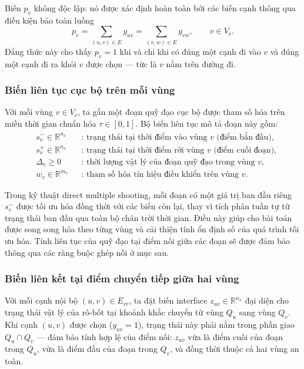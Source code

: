 Biến $p_v$ không độc lập: nó được xác định hoàn toàn bởi các biến cạnh thông qua điều kiện bảo toàn luồng
\[
p_v
=\sum_{(u,v)\in E} y_{uv}
=\sum_{(v,w)\in E} y_{vw},
\qquad v\in V_r.
\]
Đẳng thức này cho thấy $p_v=1$ khi và chỉ khi có đúng một cạnh đi vào $v$ và đúng một cạnh đi ra khỏi $v$ được chọn — tức là $v$ nằm trên đường đi.

\subsubsection{Biến liên tục cục bộ trên mỗi vùng}

Với mỗi vùng $v\in V_r$, ta gắn một đoạn quỹ đạo cục bộ được tham số hóa trên miền thời gian chuẩn hóa $\tau\in[0,1]$. Bộ biến liên tục mô tả đoạn này gồm:
\begin{align}
& s_v^- \in \mathbb R^{n_x} && \text{: trạng thái tại thời điểm vào vùng } v \text{ (điểm bắn đầu),} \nonumber\\
& s_v^+ \in \mathbb R^{n_x} && \text{: trạng thái tại thời điểm rời vùng } v \text{ (điểm cuối đoạn),} \nonumber\\
& \Delta_v \ge 0 && \text{: thời lượng vật lý của đoạn quỹ đạo trong vùng } v, \nonumber\\
& w_v \in \mathbb R^{m_v} && \text{: tham số hóa tín hiệu điều khiển trên vùng } v. \nonumber
\end{align}

Trong kỹ thuật direct multiple shooting, mỗi đoạn có một giá trị ban đầu riêng $s_v^-$ được tối ưu hóa đồng thời với các biến còn lại, thay vì tích phân tuần tự từ trạng thái ban đầu qua toàn bộ chân trời thời gian. Điều này giúp cho bài toán được song song hóa theo từng vùng và cải thiện tính ổn định số của quá trình tối ưu hóa. Tính liên tục của quỹ đạo tại điểm nối giữa các đoạn sẽ được đảm bảo thông qua các ràng buộc ghép nối ở mục sau.

\subsubsection{Biến liên kết tại điểm chuyển tiếp giữa hai vùng}

Với mỗi cạnh nội bộ $(u,v)\in E_{rr}$, ta đặt biến interface $z_{uv}\in\mathbb{R}^{n_x}$ đại diện cho trạng thái vật lý của rô-bốt tại khoảnh khắc chuyển từ vùng $Q_u$ sang vùng $Q_v$. Khi cạnh $(u,v)$ được chọn ($y_{uv}=1$), trạng thái này phải nằm trong phần giao $Q_u\cap Q_v$ — đảm bảo tính hợp lệ của điểm nối: $z_{uv}$ vừa là điểm cuối của đoạn trong $Q_u$, vừa là điểm đầu của đoạn trong $Q_v$, và đồng thời thuộc cả hai vùng an toàn.

